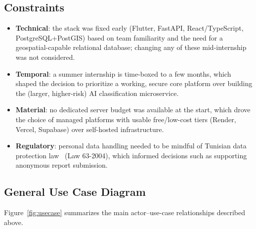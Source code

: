 \subsection{Constraints}

\begin{itemize}[leftmargin=*]
  \item \textbf{Technical}: the stack was fixed early (Flutter, FastAPI, React/TypeScript, PostgreSQL+PostGIS) based on team familiarity and the need for a geospatial-capable relational database; changing any of these mid-internship was not considered.
  \item \textbf{Temporal}: a summer internship is time-boxed to a few months, which shaped the decision to prioritize a working, secure core platform over building the (larger, higher-risk) AI classification microservice.
  \item \textbf{Material}: no dedicated server budget was available at the start, which drove the choice of managed platforms with usable free/low-cost tiers (Render, Vercel, Supabase) over self-hosted infrastructure.
  \item \textbf{Regulatory}: personal data handling needed to be mindful of Tunisian data protection law~\cite{law632004} (Law 63-2004), which informed decisions such as supporting anonymous report submission.
\end{itemize}

\subsection{General Use Case Diagram}

Figure~\ref{fig:usecase} summarizes the main actor--use-case relationships described above.

